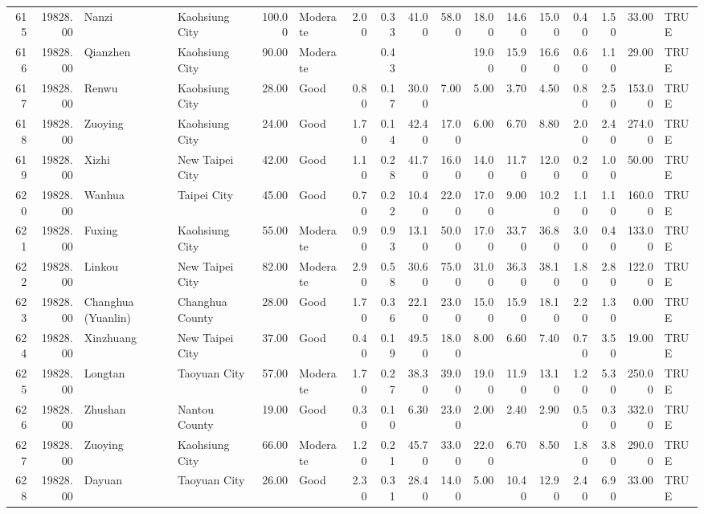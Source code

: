 \begin{table}[ht]
\begin{tabular}{rrllrlrrrrrrrrrrl}
  615 & 19828.00 & Nanzi & Kaohsiung City & 100.00 & Moderate & 2.00 & 0.33 & 41.00 & 58.00 & 18.00 & 14.60 & 15.00 & 0.40 & 1.50 & 33.00 & TRUE \\ 
  616 & 19828.00 & Qianzhen & Kaohsiung City & 90.00 & Moderate &  & 0.43 &  &  & 19.00 & 15.90 & 16.60 & 0.60 & 1.10 & 29.00 & TRUE \\ 
  617 & 19828.00 & Renwu & Kaohsiung City & 28.00 & Good & 0.80 & 0.17 & 30.00 & 7.00 & 5.00 & 3.70 & 4.50 & 0.80 & 2.50 & 153.00 & TRUE \\ 
  618 & 19828.00 & Zuoying & Kaohsiung City & 24.00 & Good & 1.70 & 0.14 & 42.40 & 17.00 & 6.00 & 6.70 & 8.80 & 2.00 & 2.40 & 274.00 & TRUE \\ 
  619 & 19828.00 & Xizhi & New Taipei City & 42.00 & Good & 1.10 & 0.28 & 41.70 & 16.00 & 14.00 & 11.70 & 12.00 & 0.20 & 1.00 & 50.00 & TRUE \\ 
  620 & 19828.00 & Wanhua & Taipei City & 45.00 & Good & 0.70 & 0.22 & 10.40 & 22.00 & 17.00 & 9.00 & 10.20 & 1.10 & 1.10 & 160.00 & TRUE \\ 
  621 & 19828.00 & Fuxing & Kaohsiung City & 55.00 & Moderate & 0.90 & 0.93 & 13.10 & 50.00 & 17.00 & 33.70 & 36.80 & 3.00 & 0.40 & 133.00 & TRUE \\ 
  622 & 19828.00 & Linkou & New Taipei City & 82.00 & Moderate & 2.90 & 0.58 & 30.60 & 75.00 & 31.00 & 36.30 & 38.10 & 1.80 & 2.80 & 122.00 & TRUE \\ 
  623 & 19828.00 & Changhua (Yuanlin) & Changhua County & 28.00 & Good & 1.70 & 0.36 & 22.10 & 23.00 & 15.00 & 15.90 & 18.10 & 2.20 & 1.30 & 0.00 & TRUE \\ 
  624 & 19828.00 & Xinzhuang & New Taipei City & 37.00 & Good & 0.40 & 0.19 & 49.50 & 18.00 & 8.00 & 6.60 & 7.40 & 0.70 & 3.50 & 19.00 & TRUE \\ 
  625 & 19828.00 & Longtan & Taoyuan City & 57.00 & Moderate & 1.70 & 0.27 & 38.30 & 39.00 & 19.00 & 11.90 & 13.10 & 1.20 & 5.30 & 250.00 & TRUE \\ 
  626 & 19828.00 & Zhushan & Nantou County & 19.00 & Good & 0.30 & 0.10 & 6.30 & 23.00 & 2.00 & 2.40 & 2.90 & 0.50 & 0.30 & 332.00 & TRUE \\ 
  627 & 19828.00 & Zuoying & Kaohsiung City & 66.00 & Moderate & 1.20 & 0.21 & 45.70 & 33.00 & 22.00 & 6.70 & 8.50 & 1.80 & 3.80 & 290.00 & TRUE \\ 
  628 & 19828.00 & Dayuan & Taoyuan City & 26.00 & Good & 2.30 & 0.31 & 28.40 & 14.00 & 5.00 & 10.40 & 12.90 & 2.40 & 6.90 & 33.00 & TRUE \\ 

\end{tabular}
\end{table}
